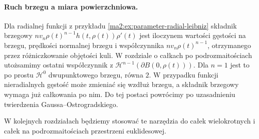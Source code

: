 \paragraph{Ruch brzegu a miara powierzchniowa.}
Dla radialnej funkcji z przykładu
\ref{ma2:ex:parameter-radial-leibniz}
składnik brzegowy
$nv_n\rho(t)^{n-1}h(t,\rho(t))\rho'(t)$
jest iloczynem wartości gęstości na brzegu,
prędkości normalnej brzegu i współczynnika
$nv_n\rho(t)^{n-1}$, otrzymanego przez
różniczkowanie objętości kuli.
W rozdziale o całkach po podrozmaitościach
utożsamimy ostatni współczynnik z
$\mathcal H^{n-1}(\partial B(0,\rho(t)))$.
Dla $n=1$ jest to po prostu $\mathcal H^0$
dwupunktowego brzegu, równa $2$.
W przypadku funkcji nieradialnych
gęstość może zmieniać się wzdłuż brzegu,
a składnik brzegowy wymaga już
całkowania po nim. Do tej postaci
powrócimy po uzasadnieniu twierdzenia
Gaussa--Ostrogradskiego.

W kolejnych rozdziałach będziemy stosować te
narzędzia do całek wielokrotnych i całek
na podrozmaitościach przestrzeni euklidesowej.
